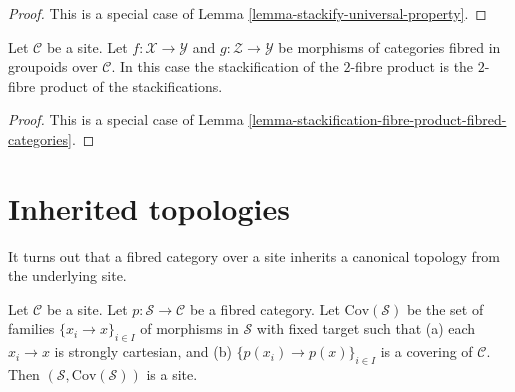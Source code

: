 \begin{proof}
This is a special case of
Lemma \ref{lemma-stackify-universal-property}.
\end{proof}

\begin{lemma}
\label{lemma-stackification-fibre-product-categories-fibred-in-groupoids}
Let $\mathcal{C}$ be a site.
Let $f : \mathcal{X} \to \mathcal{Y}$ and $g : \mathcal{Z} \to \mathcal{Y}$
be morphisms of categories fibred in groupoids over $\mathcal{C}$.
In this case the stackification of the $2$-fibre product is the $2$-fibre
product of the stackifications.
\end{lemma}

\begin{proof}
This is a special case of
Lemma \ref{lemma-stackification-fibre-product-fibred-categories}.
\end{proof}









\section{Inherited topologies}
\label{section-topology}

\noindent
It turns out that a fibred category over a site inherits a canonical
topology from the underlying site.

\begin{lemma}
\label{lemma-topology-inherited}
Let $\mathcal{C}$ be a site. Let $p : \mathcal{S} \to \mathcal{C}$
be a fibred category. Let $\text{Cov}(\mathcal{S})$
be the set of families $\{x_i \to x\}_{i \in I}$ of morphisms in $\mathcal{S}$
with fixed target such that (a) each $x_i \to x$ is strongly cartesian,
and (b) $\{p(x_i) \to p(x)\}_{i \in I}$ is a covering of $\mathcal{C}$.
Then $(\mathcal{S}, \text{Cov}(\mathcal{S}))$ is a site.
\end{lemma}

